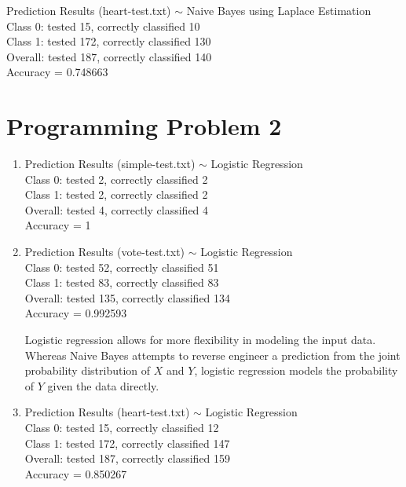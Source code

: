 \documentclass[12pt]{article}
\begin{document}
\begin{enumerate}
               Prediction Results (heart-test.txt) $\sim$
                  Naive Bayes using Laplace Estimation\\
               Class 0: tested 15, correctly classified 10\\
               Class 1: tested 172, correctly classified 130\\
               Overall: tested 187, correctly classified 140\\
               Accuracy = 0.748663

         \end{enumerate}

         \newpage
         \section*{Programming Problem 2}
            \begin{enumerate}
               \item
                  Prediction Results (simple-test.txt) $\sim$ Logistic Regression\\
                  Class 0: tested 2, correctly classified 2\\
                  Class 1: tested 2, correctly classified 2\\
                  Overall: tested 4, correctly classified 4\\
                  Accuracy = 1

               \item
                  Prediction Results (vote-test.txt) $\sim$ Logistic Regression\\
                  Class 0: tested 52, correctly classified 51\\
                  Class 1: tested 83, correctly classified 83\\
                  Overall: tested 135, correctly classified 134\\
                  Accuracy = 0.992593

                  Logistic regression allows for more flexibility in modeling the
                  input data. Whereas Naive Bayes attempts to reverse engineer a
                  prediction from the joint probability distribution of $X$ and $Y$,
                  logistic regression models the probability of $Y$ given the data
                  directly.

               \item
                  Prediction Results (heart-test.txt) $\sim$ Logistic Regression\\
                  Class 0: tested 15, correctly classified 12\\
                  Class 1: tested 172, correctly classified 147\\
                  Overall: tested 187, correctly classified 159\\
                  Accuracy = 0.850267


\end{enumerate}
\end{document}

